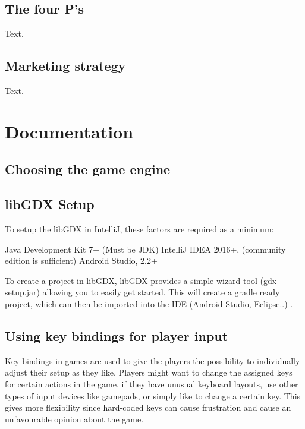 \documentclass[12p]{article}
\begin{document}
\subsection{The four P's} \label{TheFourPs}

Text.

\newpage


\subsection{Marketing strategy} \label{MarketingStrategy}

Text.


\newpage
\section{Documentation}

\subsection{Choosing the game engine}

\subsection{libGDX Setup}

To setup the libGDX in IntelliJ, these factors are required as a minimum: 

Java Development Kit 7+ (Must be JDK)
IntelliJ IDEA 2016+, (community edition is sufficient) 
Android Studio, 2.2+ 

To create a project in libGDX, libGDX provides a simple wizard tool (gdx-setup.jar) allowing you to easily get started. This will create a gradle ready project, which can then be imported into the IDE (Android Studio, Eclipse..) \cite{LibGDXSetup}.

\subsection{Using key bindings for player input}

Key bindings in games are used to give the players the possibility to individually adjust their setup as they like. Players might want to change the assigned keys for certain actions in the game, if they have unusual keyboard layouts, use other types of input devices like gamepads, or simply like to change a certain key. This gives more flexibility since hard-coded keys can cause frustration and cause an unfavourable opinion about the game.
\end{document}
